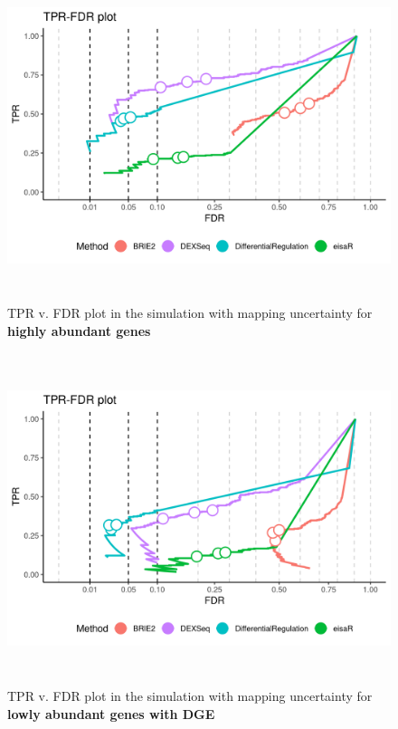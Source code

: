 \begin{figure}[!htb]
\begin{center}
\includegraphics[width=6in,height=3.8in]{../figures/simulation/minnow_simulation_high_FDR.png}
\end{center}
\caption{TPR v. FDR plot in the simulation with mapping uncertainty for \textbf{highly abundant genes}}
\label{fig:soph_sim_FDR_high}
\end{figure}

\begin{figure}[!htb]
\begin{center}
\includegraphics[width=6in,height=3.8in]{../figures/simulation/minnow_simulation_low_DGE_FDR.png}
\end{center}
\caption{TPR v. FDR plot in the simulation with mapping uncertainty for \textbf{lowly abundant genes with DGE}}
\label{fig:soph_sim_DGE_FDR_low}
\end{figure}

